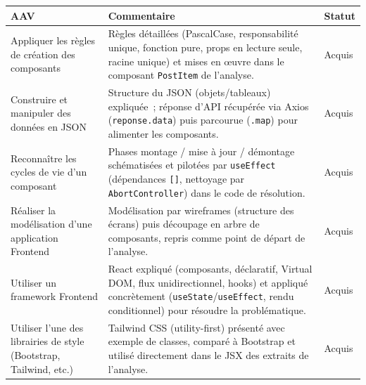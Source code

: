 \begin{center}
\setlength{\tabcolsep}{10pt}

\begin{tabular}{|p{}|p{}|m{}|}
\hline
\textbf{AAV} & \textbf{Commentaire} & \textbf{Statut} \\ \hline

Appliquer les règles de création des composants &
Règles détaillées (PascalCase, responsabilité unique, fonction pure, props en lecture seule, racine unique) et mises en \oe uvre dans le composant \texttt{PostItem} de l'analyse. &
{\color{green!60!black}Acquis} \\ \hline

Construire et manipuler des données en JSON &
Structure du JSON (objets/tableaux) expliquée~; réponse d'API récupérée via Axios (\texttt{reponse.data}) puis parcourue (\texttt{.map}) pour alimenter les composants. &
{\color{green!60!black}Acquis} \\ \hline

Reconnaître les cycles de vie d'un composant &
Phases montage / mise à jour / démontage schématisées et pilotées par \texttt{useEffect} (dépendances \texttt{[]}, nettoyage par \texttt{AbortController}) dans le code de résolution. &
{\color{green!60!black}Acquis} \\ \hline

Réaliser la modélisation d'une application Frontend &
Modélisation par wireframes (structure des écrans) puis découpage en arbre de composants, repris comme point de départ de l'analyse. &
{\color{green!60!black}Acquis} \\ \hline

Utiliser un framework Frontend &
React expliqué (composants, déclaratif, Virtual DOM, flux unidirectionnel, hooks) et appliqué concrètement (\texttt{useState}/\texttt{useEffect}, rendu conditionnel) pour résoudre la problématique. &
{\color{green!60!black}Acquis} \\ \hline

Utiliser l'une des librairies de style (Bootstrap, Tailwind, etc.) &
Tailwind CSS (utility-first) présenté avec exemple de classes, comparé à Bootstrap et utilisé directement dans le JSX des extraits de l'analyse. &
{\color{green!60!black}Acquis} \\ \hline

\end{tabular}
\end{center}

\newpage

